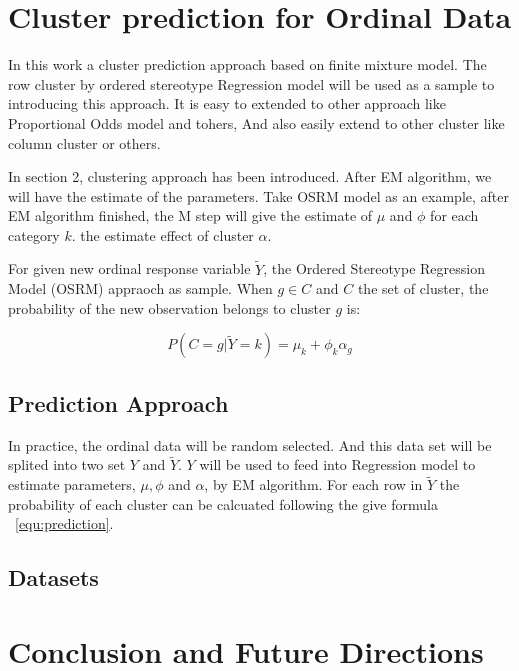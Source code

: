 \documentclass{article}
\begin{document}
\section{Cluster prediction for Ordinal Data}

In this work a cluster prediction approach based on finite mixture model.
The row cluster by ordered stereotype Regression model will be used as a sample to introducing this approach.
It is easy to extended to other approach like Proportional Odds model and tohers, 
And also easily extend to other cluster like column cluster or others.

In section 2, clustering approach has been introduced.
After EM algorithm, we will have the estimate of the parameters.
Take OSRM model as an example, after EM algorithm finished, 
the M step will give the estimate of $\mu$ and $\phi$ for each category $k$.
the estimate effect of cluster  $\alpha$.

For given new ordinal response variable $\tilde{Y}$, the Ordered Stereotype Regression Model (OSRM) appraoch as sample.
When $g \in C$ and $C$ the set of cluster, the probability of the new observation belongs to cluster $g$ is:

\begin{equation}
P(C=g|\tilde{Y}=k) = \mu_k + \phi_k \alpha_g
\label{equ:prediction}
\end{equation}

\subsection{Prediction Approach}

In practice, the ordinal data will be random selected. 
And this data set will be splited into two set $Y$ and $\tilde{Y}$.
$Y$ will be used to feed into Regression model to estimate parameters, $\mu, \phi$ and $\alpha$,  by EM algorithm.
For each row in $\tilde{Y}$ the probability of each cluster can be calcuated following the give formula ~\ref{equ:prediction}.

\subsection{Datasets}




\section{Conclusion and Future Directions}
\end{document}
